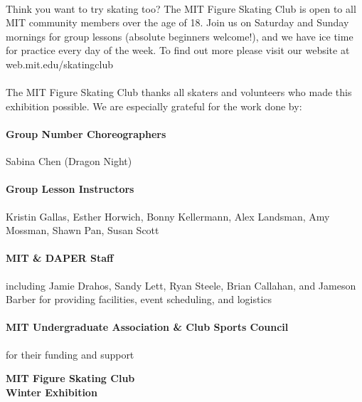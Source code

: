 \documentclass[12pt]{article}
\begin{document}
\begin{multicols*}{2}


\paragraph{} Think you want to try skating too? The MIT Figure Skating Club is open to all MIT community members over the age of 18. Join us on Saturday and Sunday mornings for group lessons (absolute beginners welcome!), and we have ice time for practice every day of the week. To find out more please visit our website at web.mit.edu/skatingclub

\paragraph{} The MIT Figure Skating Club thanks all skaters and volunteers who made this exhibition possible. We are especially grateful for the work done by:

\paragraph{Group Number Choreographers} Sabina Chen (Dragon Night)

\paragraph{Group Lesson Instructors} Kristin Gallas, Esther Horwich, Bonny Kellermann, Alex Landsman, Amy Mossman, Shawn Pan, Susan Scott
\paragraph{MIT \& DAPER Staff} including Jamie Drahos, Sandy Lett, Ryan Steele, Brian Callahan, and Jameson Barber for providing facilities, event scheduling, and logistics
\paragraph{MIT Undergraduate Association \& Club Sports Council} for their funding and support

\vfill\null
\columnbreak


\begin{center}

\vspace*{1.5in}

{\Large \textbf{MIT Figure Skating Club}}\\
{\Large \textbf{Winter Exhibition}}


\end{center}
\end{multicols*}
\end{document}
